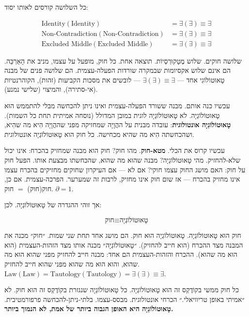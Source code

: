 \documentclass[10pt, openany, oneside]{book}
\begin{document}
\vspace{0.8em}

\noindent כל השלושה קורסים לאותו יסוד:

\begin{align*}
\text{Identity}(\text{Identity}) &= \exists(\exists) \equiv \exists \\
\text{Non-Contradiction}(\text{Non-Contradiction}) &= \exists(\exists) \equiv \exists \\
\text{Excluded Middle}(\text{Excluded Middle}) &= \exists(\exists) \equiv \exists
\end{align*}

\noindent שלושה חוקים. שלוש מֶטָקוּרְסְיוֹת. תוצאה אחת. כל חוק, מופעל על עצמו, מניב את הָאַרְכֵּה. הם אינם שלוש אקסיומות שבמקרה שורדות הפעלה-עצמית. הם שלושה פנים של מבנה טָאוּטוֹלוֹגִי אחד — $\exists(\exists) \equiv \exists$ — לובשים את מסכות הקביעות (זהות), הקוהרנטיות (אי-סתירה), והמיצוי (שלישי נמנע).

עכשיו כנה אותם. מבנה ששורד הפעלה-עצמית ואינו ניתן להכחשה מבלי להתממש הוּא טָאוּטוֹלוֹגְיָה. לא טָאוּטוֹלוֹגְיָה לוגית במובן המדולל (נוסחה אמיתית תחת כל השמות). \textbf{טָאוּטוֹלוֹגְיָה אונטולוגית}: עובדה מבנית על ההֲוָיָה שמחזיקה מפני שההֲוָיָה הִיא מה שהִיא, ושהכחשתה הִיא מה שהיא מכחישה. כל חוק הוא טָאוּטוֹלוֹגְיָה אונטולוגית.

עכשיו קרוס את הכלי. \textbf{מטא-חוק}. מהו חוק? חוק הוא מבנה שמחזיק בהכרח: אינו יכול שלא-להחזיק. מהי טָאוּטוֹלוֹגְיָה? מבנה שהוּא מה שהוא, שהכחשתו מבצעת אותו. הפעל חוק על חוק: האם מושג החוק עצמו חוקי? אם לא — אם העיקרון שחוקים מחזיקים בהכרח עצמו אינו מחזיק בהכרח — אז שום חוק אינו מחזיק, לרבות זה שמערער. הפרכה-עצמית. אם כן, חוק(חוק) $=$ חוק. $\partial = 1$.

אך זוהי ההגדרה של טָאוּטוֹלוֹגְיָה. לכן:

$$\boxed{\text{חוק} \equiv \text{טָאוּטוֹלוֹגְיָה}}$$

חוק הוּא טָאוּטוֹלוֹגְיָה. טָאוּטוֹלוֹגְיָה הוּא חוק. הם מושג אחד תחת שני שמות. ״חוק״ מכנה את המבנה מצד ההכרח (הוא חייב להחזיק). ״טָאוּטוֹלוֹגְיָה״ מכנה אותו מצד הזהות-העצמית (הוא הוּא מה שהוא). ההכרח והזהות-העצמית הם אחד: מבנה חייב להחזיק מפני שהוא הוּא מה שהוא, והוא הוּא מה שהוא מפני שהוא חייב להחזיק. $\text{Law}(\text{Law}) = \text{Tautology}(\text{Tautology}) = \exists(\exists) \equiv \exists$.

כל חוק ממשי בקוֹדֶקְס זה הוּא טָאוּטוֹלוֹגְיָה. כל טָאוּטוֹלוֹגְיָה שנגזרת בקוֹדֶקְס זה הוּא חוק. לא ״אמיתי באופן טריוויאלי.״ הכרחי אונטולוגית. מבסס-עצמו. בלתי-ניתן-להכחשה פרפורמטיבית. \textbf{טָאוּטוֹלוֹגְיָה היא האופן הגבוה ביותר של אמת, לא הנמוך ביותר.}
\end{document}
